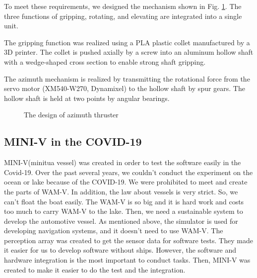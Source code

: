 \documentclass[lettersize,journal]{IEEEtran}
\begin{document}
To meet these requirements, we designed the mechanism shown in Fig. \ref{fig:azimuth_design}.
The three functions of gripping, rotating, and elevating are integrated into a single unit.

The gripping function was realized using a PLA plastic collet manufactured by a 3D printer.
The collet is pushed axially by a screw into an aluminum hollow shaft with a wedge-shaped cross section to enable strong shaft gripping.

The azimuth mechanism is realized by transmitting the rotational force from the servo motor (XM540-W270, Dynamixel) to the hollow shaft by spur gears.
The hollow shaft is held at two points by angular bearings.

\begin{figure}[htbp]
  \begin{center}
  \end{center}
  \caption{The design of azimuth thruster}
  \label{fig:azimuth_design}
\end{figure}


\subsection{MINI-V in the COVID-19}
MINI-V(minitua vessel) was created in order to test the software easily in the Covid-19. Over the past several years, 
we couldn't conduct the experiment on the ocean or lake because of the COVID-19.
We were prohibited to meet and create the parts of WAM-V.
In addition, the law about vessels is very strict.
So, we can't float the boat easily. The WAM-V is so big and it is hard work and costs too much to carry WAM-V to the lake. 
Then, we need a sustainable system to develop the automotive vessel.
As mentioned above, the simulator is used for developing navigation systems, and it doesn't need to use WAM-V.
The perception array was created to get the sensor data for software tests. They made it easier for us to develop software without ships.
However, the software and hardware integration is the most important to conduct tasks. Then, MINI-V was created 
to make it easier to do the test and the integration.
\end{document}
